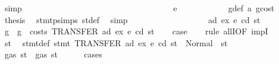 \begin{isabellebody}
\ simp\isanewline
\ \ \ \ \ \ \ \ \ \ \isamarkupfalse%
\isanewline
\ \ \ \ \ \ \ \ \isamarkupfalse%
\isanewline
\ \ \ \ \ \ \isamarkupfalse%
\isanewline
\ \ \ \ \ \ \ \ \isamarkupfalse%
\ {\isacharparenleft}{\kern0pt}e\ {\isacharunderscore}{\kern0pt}{\isacharparenright}{\kern0pt}\isanewline
\ \ \ \ \ \ \ \ \isamarkupfalse%
\ {}{\isacharparenleft}{\kern0pt}{}{\isacharparenright}{\kern0pt}\ g{\isacharunderscore}{\kern0pt}def\ a{}\ gcost\ \isamarkupfalse%
\ {\isacharquery}{\kern0pt}thesis\ \isamarkupfalse%
\ stmt{\isachardot}{\kern0pt}psimps{\isacharparenleft}{\kern0pt}{}{\isacharparenright}{\kern0pt}\ st{\isacharprime}{\kern0pt}{\isacharunderscore}{\kern0pt}def\ \isamarkupfalse%
\ simp\isanewline
\ \ \ \ \ \ \isamarkupfalse%
\isanewline
\ \ \ \ \isamarkupfalse%
\isanewline
\ \ \isamarkupfalse%
\isanewline
{}\isamarkupfalse%
\isanewline
\ \ \isamarkupfalse%
\ {\isacharparenleft}{\kern0pt}{}\ ad\ ex\ e\ cd\ st{\isacharparenright}{\kern0pt}\isanewline
\ \ \isamarkupfalse%
\ g\ \ {\isachardoublequoteopen}g\ {\isacharequal}{\kern0pt}\ costs\ {\isacharparenleft}{\kern0pt}TRANSFER\ ad\ ex{\isacharparenright}{\kern0pt}\ e\ cd\ st{\isachardoublequoteclose}\isanewline
\ \ \isamarkupfalse%
\ {\isacharquery}{\kern0pt}case\isanewline
\ \ \isamarkupfalse%
\ {\isacharparenleft}{\kern0pt}rule\ allI{\isacharbrackleft}{\kern0pt}OF\ impI{\isacharbrackright}{\kern0pt}{\isacharparenright}{\kern0pt}\isanewline
\ \ \ \ \isamarkupfalse%
\ st{}{\isacharprime}{\kern0pt}\ \isamarkupfalse%
\ stmt{\isacharunderscore}{\kern0pt}def{\isacharcolon}{\kern0pt}\ {\isachardoublequoteopen}stmt\ {\isacharparenleft}{\kern0pt}TRANSFER\ ad\ ex{\isacharparenright}{\kern0pt}\ e\ cd\ st\ {\isacharequal}{\kern0pt}\ Normal\ {\isacharparenleft}{\kern0pt}{\isacharparenleft}{\kern0pt}{\isacharparenright}{\kern0pt}{\isacharcomma}{\kern0pt}\ st{}{\isacharprime}{\kern0pt}{\isacharparenright}{\kern0pt}{\isachardoublequoteclose}\isanewline
\ \ \ \ \isamarkupfalse%
\ {\isachardoublequoteopen}gas\ st{}{\isacharprime}{\kern0pt}\ {\isasymle}\ gas\ st{\isachardoublequoteclose}\isanewline
\ \ \ \ \isamarkupfalse%
\ cases\isanewline
\ \ \ \ \ \ \isamarkupfalse%

\end{isabellebody}
